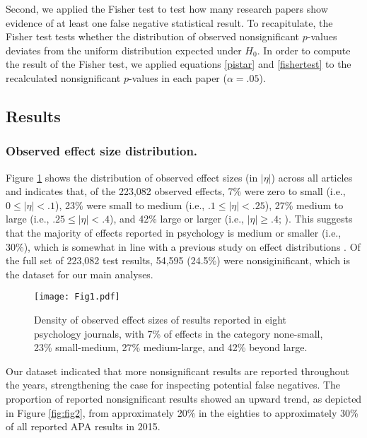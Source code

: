 \documentclass{article}
\begin{document}
Second, we applied the Fisher test to test how many research papers show evidence of at least one false negative statistical result. To recapitulate, the Fisher test tests whether the distribution of observed nonsignificant $p$-values deviates from the uniform distribution expected under $H_0$. In order to compute the result of the Fisher test, we applied equations \ref{pistar} and \ref{fishertest} to the recalculated nonsignificant $p$-values in each paper ($\alpha=.05$).

\subsection*{Results}

\subsubsection*{Observed effect size distribution.}


Figure \ref{fig:fig1} shows the distribution of observed effect sizes (in $|\eta|$) across all articles and indicates that, of the 223,082 observed effects, 7\% were zero to small (i.e., $0\leq|\eta|<.1$), 23\% were small to medium (i.e., $.1\leq|\eta|<.25$), 27\% medium to large (i.e., $.25\leq|\eta|<.4$), and 42\% large or larger (i.e., $|\eta|\geq.4$; \cite{Cohen1988-wg}). This suggests that the majority of effects reported in psychology is medium or smaller (i.e., 30\%), which is somewhat in line with a previous study on effect distributions \cite{Gignac2016-je}. Of the full set of 223,082 test results, 54,595 (24.5\%) were nonsiginificant, which is the dataset for our main analyses. 

\begin{figure}
\begin{center}
\texttt{[image: Fig1.pdf]}
\end{center}
\caption{Density of observed effect sizes of results reported in eight psychology journals, with 7\% of effects in the category none-small, 23\% small-medium, 27\% medium-large, and 42\% beyond large.}
\label{fig:fig1}
\end{figure}

Our dataset indicated that more nonsignificant results are reported throughout the years, strengthening the case for inspecting potential false negatives. The proportion of reported nonsignificant results showed an upward trend, as depicted in Figure \ref{fig:fig2}, from approximately 20\% in the eighties to approximately 30\% of all reported APA results in 2015.
\end{document}
